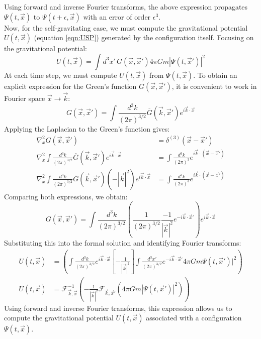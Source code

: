 \documentclass[12pt]{article}
\begin{document}
Using forward and inverse Fourier transforms, the above expression propagates $\Psi(t,\vec{x})$ to $\Psi(t+\epsilon,\vec{x})$ with an error of order $\epsilon^3$.\\
Now, for the self-gravitating case, we must compute the gravitational potential $U(t,\vec{x})$ (equation \ref{eqn:USP}) generated by the configuration itself. Focusing on the gravitational potential:
\begin{equation}
    U(t,\vec{x})=\int d^{3}x' \, G(\vec{x},\vec{x}')4\pi G m |\Psi(t,\vec{x}')|^2
\end{equation}
At each time step, we must compute $U(t,\vec{x})$ from $\Psi(t,\vec{x})$. To obtain an explicit expression for the Green’s function $G(\vec{x},\vec{x}')$, it is convenient to work in Fourier space $\vec{x} \rightarrow \vec{k}$:
\begin{equation}
    G(\vec{x},\vec{x}')=\int \frac{d^{3}k}{(2\pi)^{3/2}} \overline{G}(\vec{k},\vec{x}')e^{i\vec{k}\cdot\vec{x}}
\end{equation}
Applying the Laplacian to the Green’s function gives:
\begin{align}
    \nabla^2_{x} G(\vec{x},\vec{x}')&= \delta^{(3)}(\vec{x}-\vec{x}') \\
    \nabla^2_{x} \int \frac{d^{3}k}{(2\pi)^{3/2}} \overline{G}(\vec{k},\vec{x}')e^{i\vec{k}\cdot\vec{x}}&=\int \frac{d^{3}k}{(2\pi)^3}e^{i\vec{k}\cdot (\vec{x}-\vec{x}')} \\
    \nabla^2_{x} \int \frac{d^{3}k}{(2\pi)^{3/2}} \overline{G}(\vec{k},\vec{x}')(-|\vec{k}|^2)e^{i\vec{k}\cdot\vec{x}} &= \int \frac{d^{3}k}{(2\pi)^3}e^{i\vec{k}\cdot (\vec{x}-\vec{x}')}
\end{align}
Comparing both expressions, we obtain:
\begin{equation}
    G(\vec{x},\vec{x}')=\int \frac{d^{3}k}{(2\pi)^{3/2}}\left(\frac{1}{(2\pi)^{3/2}}\frac{-1}{|\vec{k}|^2}e^{-i\vec{k}\cdot \vec{x}'} \right)e^{i\vec{k}\cdot \vec{x}}
\end{equation}
Substituting this into the formal solution and identifying Fourier transforms:
\begin{align}
    U(t,\vec{x})&=\left(\int \frac{d^{3}k}{(2\pi)^{3/2}}e^{i\vec{k}\cdot \vec{x}}\left[-\frac{1}{|\vec{k}|^2} \right]\int \frac{d^{3}x'}{(2\pi)^{3/2}}e^{-i\vec{k}\cdot \vec{x}'}4\pi G m \Psi(t,\vec{x}')|^2 \right) \label{eqn:UTE}\\
    U(t,\vec{x})&=\mathcal{F}^{-1}_{\vec{k},\vec{x}}\left( -\frac{1}{|\vec{k}|^2} \mathcal{F}_{\vec{k},\vec{x}'}\left(4 \pi G m |\Psi(t,\vec{x}')|^2 \right) \right)
\end{align}
Using forward and inverse Fourier transforms, this expression allows us to compute the gravitational potential $U(t,\vec{x})$ associated with a configuration $\Psi(t,\vec{x})$.
\end{document}
